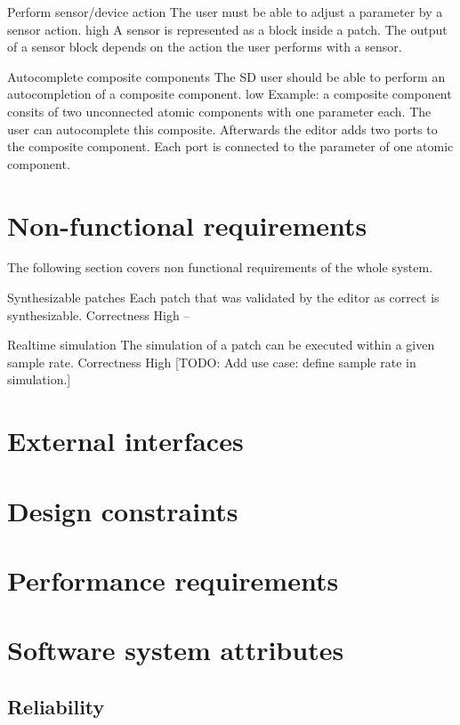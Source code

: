	{Perform sensor/device action}
	{The user must be able to adjust a parameter by a sensor action.}
	{high}
	{A sensor is represented as a block inside a patch. The output of a sensor block depends on the action the user performs with a sensor.}
	
	{Autocomplete composite components}
	{The SD user should be able to perform an autocompletion of a composite component.}
	{low}
	{Example: a composite component consits of two unconnected atomic components with one parameter each. The user can autocomplete this composite. Afterwards the editor adds two ports to the composite component. Each port is connected to the parameter of one atomic component.}
	
	\section{Non-functional requirements}
	
	The following section covers non functional requirements of the whole system.
	
	{Synthesizable patches}
	{Each patch that was validated by the editor as correct is synthesizable.}
	{Correctness}
	{High}
	{--}
	
	{Realtime simulation}
	{The simulation of a patch can be executed within a given sample rate.}
	{Correctness}
	{High}
	{[TODO: Add use case: define sample rate in simulation.]}
	
	
	\section{External interfaces}
	\section{Design constraints}
	\section{Performance requirements}
	\section{Software system attributes}
		\subsection{Reliability}
		
